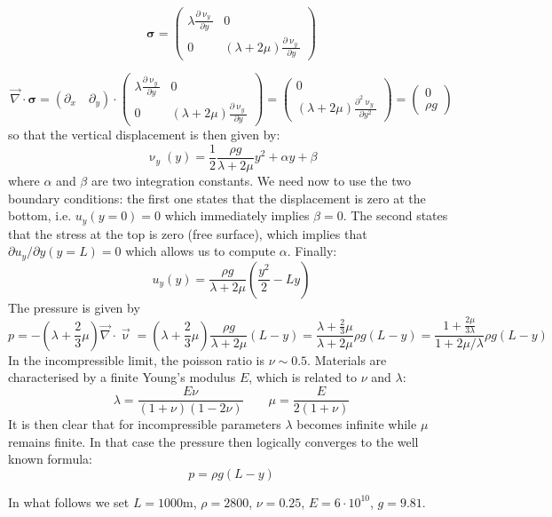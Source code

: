 \[
{\bm \sigma} =
\left(
\begin{array}{cc}
\lambda \frac{\partial \upnu_y}{\partial y} &  0 \\
0 & (\lambda + 2 \mu) \frac{\partial \upnu_y}{\partial y}
\end{array}
\right)
\]

\[
{\vec \nabla}\cdot {\bm \sigma} =
(\partial_x \quad \partial_y)\cdot 
\left(
\begin{array}{cc}
\lambda \frac{\partial \upnu_y}{\partial y} &  0 \\
0 & (\lambda + 2 \mu) \frac{\partial \upnu_y}{\partial y}
\end{array}
\right)
=
\left(
\begin{array}{c}
0 \\
(\lambda + 2 \mu) \frac{\partial^2 \upnu_y}{\partial y^2}
\end{array}
\right)
=
\left(
\begin{array}{c}
0 \\
\rho g
\end{array}
\right)
\]
so that the vertical displacement is then given by:
\[
\upnu_y(y) = \frac{1}{2} \frac{\rho g}{\lambda + 2 \mu} y^2 + \alpha y + \beta 
\] 
where $\alpha$ and $\beta$ are two integration constants.
We need now to use the two boundary conditions: the first one states that the displacement
is zero at the bottom, i.e. $u_y(y=0)=0$ which immediately implies $\beta=0$.
The second states that the stress at the top is zero (free surface), which implies that 
$\partial u_y/\partial y (y=L)=0$ which allows us to compute $\alpha$.
Finally:
\[
u_y(y) = \frac{\rho g}{\lambda + 2 \mu} \left(\frac{y^2}{2}-L y\right) 
\] 
The pressure is given by
\[
p=-\left(\lambda + \frac{2}{3} \mu\right) {\vec \nabla}\cdot{\vec\upnu}
= \left(\lambda + \frac{2}{3} \mu\right)  \frac{\rho g}{\lambda + 2 \mu} (L -y)
= \frac{\lambda + \frac{2}{3} \mu}{\lambda + 2 \mu} \rho g (L-y)  
= \frac{1 + \frac{2 \mu}{3 \lambda} }{1 + 2 \mu/\lambda} \rho g (L-y)  
\]
In the incompressible limit, the poisson ratio is $\nu \sim 0.5$. 
Materials are characterised by a finite Young's modulus $E$, which is related to 
$\nu$ and $\lambda$:
\[
\lambda=\frac{E \nu}{(1+\nu)(1-2\nu)}
\quad\quad
\mu=\frac{E}{2(1+\nu)}
\]
It is then clear that for incompressible parameters $\lambda$ becomes 
infinite while $\mu$ remains finite. In that case the pressure 
then logically converges to the well known formula:
\[
p=\rho g (L-y)
\]

In what follows we set $L=1000$m, $\rho=2800$, $\nu=0.25$, $E=6\cdot10^{10}$, $g=9.81$.

